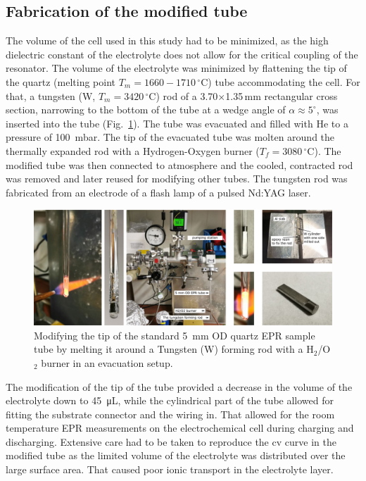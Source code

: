 \subsection{Fabrication of the modified tube}
%
The volume of the cell used in this study had to be minimized, as the high dielectric constant of the electrolyte does not allow for the critical coupling of the resonator. The volume of the electrolyte was minimized by flattening the tip of the quartz (melting point $T_m=1660-1710\,^{\circ}$C) tube accommodating the cell. For that, a tungsten (W, $T_m=3420\,^{\circ}$C) rod of a 3.70$\times$1.35$\,$mm rectangular cross section, narrowing to the bottom of the tube at a wedge angle of $\alpha \approx 5 ^{\circ}$, was inserted into the tube (Fig.~\ref{fig:S1_modified_tube}). The tube was evacuated and filled with He to a pressure of 100~mbar. The tip of the evacuated tube was molten around the thermally expanded rod with a Hydrogen-Oxygen burner ($T_f = 3080\,^{\circ}$C). The modified tube was then connected to atmosphere and the cooled, contracted rod was removed and later reused for modifying other tubes. The tungsten rod was fabricated from an electrode of a flash lamp of a pulsed Nd:YAG laser.\\

\begin{figure}[h!]
\centering
\includegraphics[width=1\textwidth]{./operando_epr/figures/spins_at_work/Figure_S1.pdf}
\caption{Modifying the tip of the standard 5~mm OD quartz EPR sample tube by melting it around a Tungsten (W) forming rod with a H$_2$/O$_2$ burner in an evacuation setup.}
\label{fig:S1_modified_tube}
\end{figure}

The modification of the tip of the tube provided a decrease in the volume of the electrolyte down to \SI{45}{\micro\liter}, while the cylindrical part of the tube allowed for fitting the substrate connector and the wiring in. That allowed for the room temperature EPR measurements on the electrochemical cell during charging and discharging. Extensive care had to be taken to reproduce the cv curve in the modified tube as the limited volume of the electrolyte was distributed over the large surface area. That caused poor ionic transport in the electrolyte layer.\\



